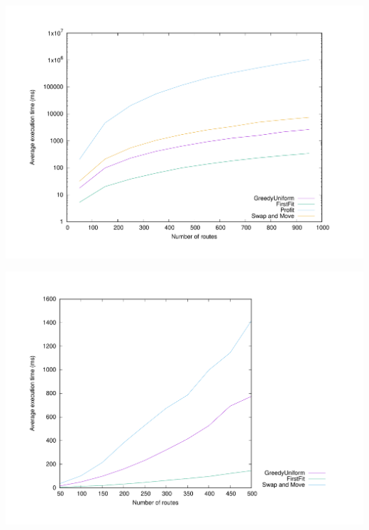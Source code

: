 \documentclass[a4paper,cleveref, autoref, thm-restate,UKenglish]{lipics-v2019}
\begin{document}
\begin{minipage}[c]{.49\linewidth} 
\begin{center}
\includegraphics[scale=0.275]{log}
\end{center}
\label{fig:timelog}
\end{minipage}
\begin{minipage}[c]{.45\linewidth}
\begin{center}
\includegraphics[scale=0.275]{profithidden}
\end{center}
\label{fig:timeprofithidden}
\end{minipage}
\end{document}
